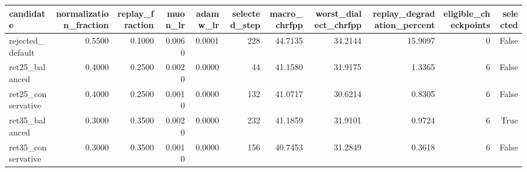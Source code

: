 \begin{tabular}{lrrrrrrrrrr}
\toprule
candidate & normalization\_fraction & replay\_fraction & muon\_lr & adamw\_lr & selected\_step & macro\_chrfpp & worst\_dialect\_chrfpp & replay\_degradation\_percent & eligible\_checkpoints & selected \\
\midrule
rejected\_default & 0.5500 & 0.1000 & 0.0060 & 0.0001 & 228 & 44.7135 & 34.2144 & 15.9097 & 0 & False \\
ret25\_balanced & 0.4000 & 0.2500 & 0.0020 & 0.0000 & 44 & 41.1580 & 31.9175 & 1.3365 & 6 & False \\
ret25\_conservative & 0.4000 & 0.2500 & 0.0010 & 0.0000 & 132 & 41.0717 & 30.6214 & 0.8305 & 6 & False \\
ret35\_balanced & 0.3000 & 0.3500 & 0.0020 & 0.0000 & 232 & 41.1859 & 31.9101 & 0.9724 & 6 & True \\
ret35\_conservative & 0.3000 & 0.3500 & 0.0010 & 0.0000 & 156 & 40.7453 & 31.2849 & 0.3618 & 6 & False \\
\bottomrule
\end{tabular}

